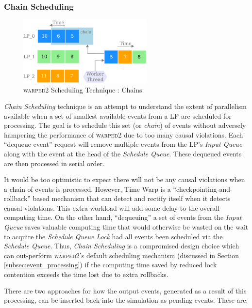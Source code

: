 \documentclass[11pt]{book}
\begin{document}
\subsubsection{Chain Scheduling}\label{subsubsec:chain_scheduling}

\begin{figure}
    \centering
    \includegraphics[width=0.6\textwidth]{figures/chain.pdf}
    \caption{\textsc{warped2} Scheduling Technique : Chains}\label{fig:chains}
\end{figure}

\emph{Chain Scheduling} technique is an attempt to understand the extent of parallelism available when a set
of smallest available events from a LP are scheduled for processing.  The goal is to schedule this set (or
\emph{chain}) of events without adversely hampering the performance of \textsc{warped2} due to too many causal
violations.  Each ``dequeue event'' request will remove multiple events from the LP's \emph{Input Queue} along
with the event at the head of the \emph{Schedule Queue}.  These dequeued events are then processed in serial
order.

It would be too optimistic to expect there will not be any causal violations when a chain of events is
processed.  However, Time Warp is a ``checkpointing-and-rollback'' based mechanism that can detect and rectify
itself when it detects causal violations.  This extra workload will add some delay to the overall computing
time.  On the other hand, ``dequeuing'' a set of events from the \emph{Input Queue} saves valuable computing
time that would otherwise be wasted on the wait to acquire the \emph{Schedule Queue Lock} had all events been
scheduled via the \emph{Schedule Queue}.  Thus, \emph{Chain Scheduling} is a compromised design choice which
can out-perform \textsc{warped2}'s default scheduling mechanism (discussed in Section
\ref{subsec:event_processing}) if the computing time saved by reduced lock contention exceeds the time lost
due to extra rollbacks.

There are two approaches for how the output events, generated as a result of this processing, can be
inserted back into the simulation as pending events. These are:
\end{document}
